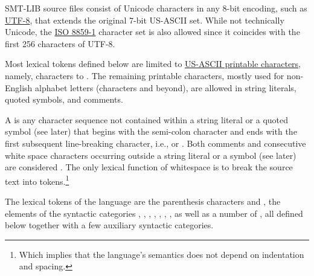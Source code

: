 %
SMT-LIB source files consist of Unicode characters in any 8-bit encoding, 
such as \href{http://en.wikipedia.org/wiki/UTF-8}{UTF-8},  
that extends the original 7-bit US-ASCII set.
While not technically Unicode,
the \href{http://en.wikipedia.org/wiki/ISO_8859-1}{ISO 8859-1} 
character set is also allowed since it coincides 
with the first 256 characters of UTF-8.

Most lexical tokens defined below are limited to \href{http://en.wikipedia.org/wiki/ASCII#ASCII_printable_characters}{US-ASCII printable characters},
namely, characters  to .
The remaining printable characters,
mostly used for non-English alphabet letters
(characters  and beyond), %
are allowed in string literals, quoted symbols, and comments.

%
A  is any character sequence 
not contained within a string literal or a quoted symbol (see later)
that begins with the semi-colon character \ter{;}
and ends with the first subsequent line-breaking character,
i.e.,  or .
Both comments and consecutive white space characters occurring outside
a string literal or a symbol (see later) are considered .
The only lexical function of whitespace is to break the source text into tokens.\footnote{%
Which implies that the language's semantics does not depend on indentation and spacing.
}

The lexical tokens of the language are
the parenthesis characters \ter{(} and \ter{)},
the elements of the syntactic categories 
,
,
,
,
,
,
,
as well as a number of ,
all defined below together with a few auxiliary syntactic categories.


